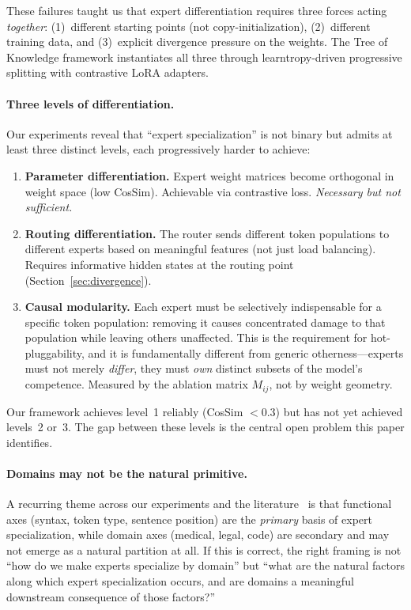 \documentclass{article}
\newcommand{\tok}{Tree of Knowledge}
\begin{document}
These failures taught us that expert differentiation requires three forces acting
\emph{together}: (1)~different starting points (not copy-initialization),
(2)~different training data, and (3)~explicit divergence pressure on the weights.
The \tok{} framework instantiates all three through learntropy-driven progressive
splitting with contrastive LoRA adapters.

\paragraph{Three levels of differentiation.}
Our experiments reveal that ``expert specialization'' is not binary but admits
at least three distinct levels, each progressively harder to achieve:

\begin{enumerate}[nosep]
    \item \textbf{Parameter differentiation.} Expert weight matrices become
          orthogonal in weight space (low CosSim). Achievable via contrastive
          loss. \emph{Necessary but not sufficient.}
    \item \textbf{Routing differentiation.} The router sends different token
          populations to different experts based on meaningful features (not
          just load balancing). Requires informative hidden states at the
          routing point (Section~\ref{sec:divergence}).
    \item \textbf{Causal modularity.} Each expert must be selectively
          indispensable for a specific token population: removing it causes
          concentrated damage to that population while leaving others
          unaffected. This is the requirement for hot-pluggability, and it is
          fundamentally different from generic otherness---experts must not
          merely \emph{differ}, they must \emph{own} distinct subsets of the
          model's competence. Measured by the ablation matrix $M_{ij}$, not by
          weight geometry.
\end{enumerate}

Our framework achieves level~1 reliably (CosSim $<$0.3) but has not yet
achieved levels~2 or~3. The gap between these levels is the central open
problem this paper identifies.

\paragraph{Domains may not be the natural primitive.}
A recurring theme across our experiments and the literature~\cite{standing2026,
domaindriver2026, openmoe2024} is that functional axes (syntax, token type,
sentence position) are the \emph{primary} basis of expert specialization, while
domain axes (medical, legal, code) are secondary and may not emerge as a
natural partition at all. If this is correct, the right framing is not ``how
do we make experts specialize by domain'' but ``what are the natural factors
along which expert specialization occurs, and are domains a meaningful
downstream consequence of those factors?''
\end{document}
